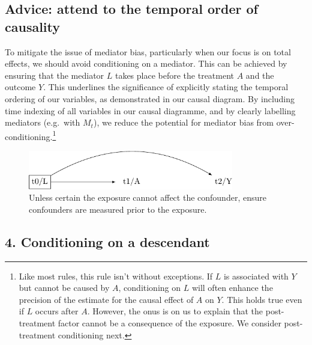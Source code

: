 \documentclass[
  singlecolumn]{report}
\begin{document}
\hypertarget{advice-attend-to-the-temporal-order-of-causality}{%
\subsection{Advice: attend to the temporal order of
causality}\label{advice-attend-to-the-temporal-order-of-causality}}

To mitigate the issue of mediator bias, particularly when our focus is
on total effects, we should avoid conditioning on a mediator. This can
be achieved by ensuring that the mediator \(L\) takes place before the
treatment \(A\) and the outcome \(Y\). This underlines the significance
of explicitly stating the temporal ordering of our variables, as
demonstrated in our causal diagram. By including time indexing of all
variables in our causal diagramme, and by clearly labelling mediators
(e.g.~with \(M_t\)), we reduce the potential for mediator bias from
over-conditioning.\footnote{Like most rules, this rule isn't without
  exceptions. If \(L\) is associated with \(Y\) but cannot be caused by
  \(A\), conditioning on \(L\) will often enhance the precision of the
  estimate for the causal effect of \(A\) on \(Y\). This holds true even
  if \(L\) occurs after \(A\). However, the onus is on us to explain
  that the post-treatment factor cannot be a consequence of the
  exposure. We consider post-treatment conditioning next.}

\begin{figure}

{\centering \includegraphics[width=0.8\textwidth,height=\textheight]{causal-dags_files/figure-pdf/fig-dag-mediator-solution-1.pdf}

}

\caption{\label{fig-dag-mediator-solution}Unless certain the exposure
cannot affect the confounder, ensure confounders are measured prior to
the exposure.}

\end{figure}

\hypertarget{conditioning-on-a-descendant}{%
\subsection{4. Conditioning on a
descendant}\label{conditioning-on-a-descendant}}
\end{document}
